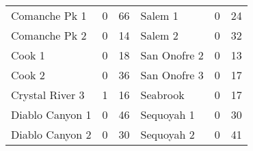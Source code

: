 \documentclass {book}
\begin{document}
\begin{enumerate}[\ref{ch10}.1]
\begin{table}
\begin{tabular}{lcr |lcr}
Comanche Pk 1    & {\hspace{0.1in}}0\mbox{\hspace{0.1in}} & 66\phantom{*}   &{\hspace{0.1in}}Salem 1          & {\hspace{0.1in}}0\mbox{\hspace{0.1in}} & 24\\
Comanche Pk 2    & {\hspace{0.1in}}0\mbox{\hspace{0.1in}} & 14\phantom{*}   &{\hspace{0.1in}}Salem 2          & {\hspace{0.1in}}0\mbox{\hspace{0.1in}} & 32\\
Cook 1           & {\hspace{0.1in}}0\mbox{\hspace{0.1in}} & 18\phantom{*}   &{\hspace{0.1in}}San Onofre 2     & {\hspace{0.1in}}0\mbox{\hspace{0.1in}} & 13 \\
Cook 2           & {\hspace{0.1in}}0\mbox{\hspace{0.1in}} & 36\phantom{*}   &{\hspace{0.1in}}San Onofre 3     & {\hspace{0.1in}}0\mbox{\hspace{0.1in}} & 17\\
Crystal River 3  & {\hspace{0.1in}}1\mbox{\hspace{0.1in}} & 16\phantom{*}   &{\hspace{0.1in}}Seabrook         & {\hspace{0.1in}}0\mbox{\hspace{0.1in}} & 17\\
Diablo Canyon 1  & {\hspace{0.1in}}0\mbox{\hspace{0.1in}} & 46\phantom{*}   &{\hspace{0.1in}}Sequoyah 1       & {\hspace{0.1in}}0\mbox{\hspace{0.1in}} & 30\\
Diablo Canyon 2  & {\hspace{0.1in}}0\mbox{\hspace{0.1in}} & 30\phantom{*}   &{\hspace{0.1in}}Sequoyah 2       & {\hspace{0.1in}}0\mbox{\hspace{0.1in}} & 41\\

\end{tabular}
\end{table}
\end{enumerate}
\end{document}

